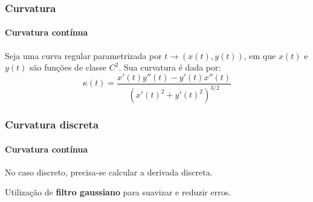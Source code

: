 \begin{frame}
\frametitle{Curvatura}
\framesubtitle{Curvatura contínua}

Seja uma curva regular parametrizada por $t \rightarrow (x(t), y(t))$, em que $x(t)$ e $y(t)$ são funções de classe $C^2$. Sua curvatura é dada por:
$$\kappa (t) = \frac{x'(t) y''(t) - y'(t) x''(t)}{(x'(t)^2 + y'(t)^2)^{3/2}}$$   

\end{frame}

\begin{frame}
\frametitle{Curvatura discreta}
\framesubtitle{Curvatura contínua}

No caso discreto, precisa-se calcular a derivada discreta.

\medskip

Utilização de \textbf{filtro gaussiano} para suavizar e reduzir erros.

\end{frame}


